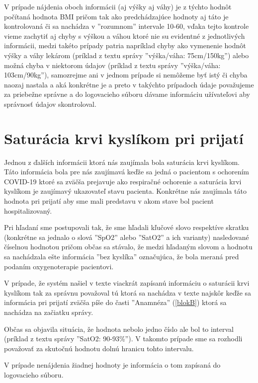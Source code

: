 V prípade nájdenia oboch informácii (aj výšky aj váhy) je z týchto hodnôt počítaná hodnota BMI pričom tak ako predchádzajúce hodnoty aj táto je kontrolovaná či sa nachádza v ''rozumnom'' intervale 10-60, vďaka tejto kontrole vieme zachytiť aj chyby s výškou a váhou ktoré nie su evidentné z jednotlivých informácii, medzi takéto prípady patria napríklad chyby ako vymenenie hodnôt výšky a váhy lekárom (príklad z textu správy ''výška/váha: 75cm/150kg'') alebo možná chyba v niektorom údajov (príklad z textu správy ''výška/váha: 103cm/90kg''), samozrejme ani v jednom prípade si nemôžeme byť istý či chyba naozaj nastala a aká konkrétne je a preto v takýchto prípadoch údaje považujeme za priebežne správne a do logovacieho súboru dávame informáciu užívateľovi aby správnosť údajov skontroloval. 

\section{Saturácia krvi kyslíkom pri prijatí}
\label{saturacia}

Jednou z ďalších informácii ktorá nás zaujímala bola saturácia krvi kyslíkom. Táto informácia bola pre nás zaujímavá keďže sa jedná o pacientom s ochorením COVID-19 ktoré sa zväčša prejavuje ako respiračné ochorenie a saturácia krvi kyslíkom je zaujímavý ukazovateľ stavu pacienta. Konkrétne nás zaujímala táto hodnota pri prijatí aby sme mali predstavu v akom stave bol pacient hospitalizovaný. 

Pri hľadaní sme postupovali tak, že sme hľadali kľučové slovo respektíve skratku (konkrétne sa jednalo o slová ''SpO2'' alebo ''SatO2'' a ich varianty) nasledované číselnou hodnotou pričom občas sa stávalo, že medzi hľadaným slovom a hodnotu sa nachádzala ešte informácia ''bez kyslíka'' označujúca, že bola meraná pred podaním oxygenoterapie pacientovi.

V prípade, že systém našiel v texte viackrát zapísanú informáciu o saturácii krvi kyslíkom tak za správnu považoval tú ktorá sa nachádza v texte najskôr keďže sa informácia pri prijatí zväčša píše do časti ''Anamnéza'' (\ref{blokB}) ktorá sa nachádza na začiatku správy.

Občas sa objavila situácia, že hodnota nebolo jedno číslo ale bol to interval (príklad z textu správy ''SatO2: 90-93\%''). V takomto prípade sme sa rozhodli považovať za skutočnú hodnotu dolnú hranicu tohto intervalu.

V prípade nenájdenia žiadnej hodnoty je informácia o tom zapísaná do logovacieho súboru. 

